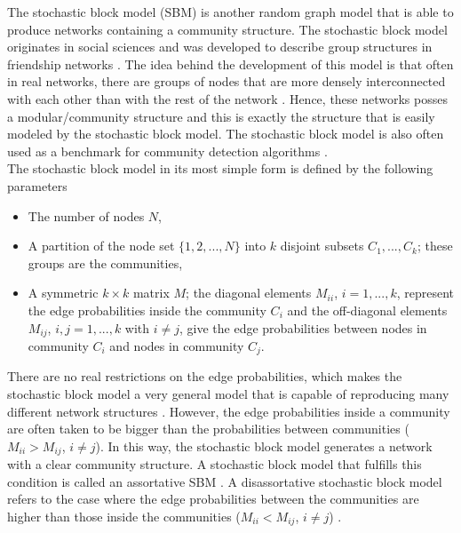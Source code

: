 \documentclass[11 pt , letterpaper , twoside , openright]{book}
\begin{document}
The stochastic block model (SBM) is another random graph model that is able to produce networks containing a community structure. The stochastic block model originates in social sciences and was developed to describe group structures in friendship networks \cite{Funke2019}. The idea behind the development of this model is that often in real networks, there are groups of nodes that are more densely interconnected with each other than with the rest of the network \cite{F.Costa2007}. Hence, these networks posses a modular/community structure and this is exactly the structure that is easily modeled by the stochastic block model. The stochastic block model is also often used as a benchmark for community detection algorithms \cite{Abbe2018}.\\
\newline
The stochastic block model in its most simple form is defined by the following parameters \cite{Clauset2017}
\begin{itemize}
	\item The number of nodes $N$, 
	\item A partition of the node set $\{1, 2, ..., N\}$ into $k$ disjoint subsets $C_1, ..., C_k$; these groups are the communities,
	\item A symmetric $k\times k$ matrix $M$; the diagonal elements $M_{ii}$, $i = 1, ..., k$, represent the edge probabilities inside the community $C_i$ and the off-diagonal elements $M_{ij}$, $i, j = 1, ..., k$ with $i \neq j$, give the edge probabilities between nodes in community $C_i$ and nodes in community $C_j$.
\end{itemize}
There are no real restrictions on the edge probabilities, which makes the stochastic block model a very general model that is capable of reproducing many different network structures \cite{Karrer2011}. However, the edge probabilities inside a community are often taken to be bigger than the probabilities between communities ($M_{ii} > M_{ij}$, $i \neq j$). In this way, the stochastic block model generates a network with a clear community structure. A stochastic block model that fulfills this condition is called an assortative SBM \cite{Lee2019}. A disassortative stochastic block model refers to the case where the edge probabilities between the communities are higher than those inside the communities ($M_{ii} < M_{ij}$, $i \neq j$) \cite{Gribel2020}.\\
\newline
\end{document}
